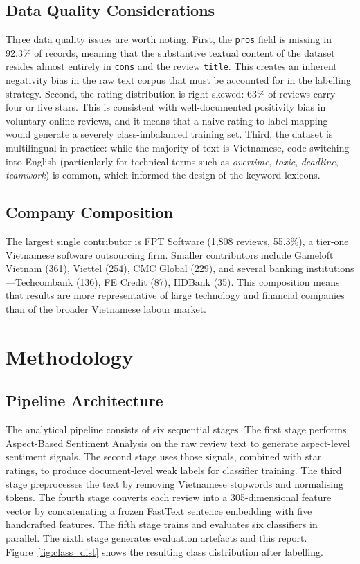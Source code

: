 \documentclass[12pt, a4paper]{article}
\begin{document}
\subsection{Data Quality Considerations}

Three data quality issues are worth noting. First, the \texttt{pros} field is missing in 92.3\% of records, meaning that the substantive textual content of the dataset resides almost entirely in \texttt{cons} and the review \texttt{title}. This creates an inherent negativity bias in the raw text corpus that must be accounted for in the labelling strategy. Second, the rating distribution is right-skewed: 63\% of reviews carry four or five stars. This is consistent with well-documented positivity bias in voluntary online reviews, and it means that a naive rating-to-label mapping would generate a severely class-imbalanced training set. Third, the dataset is multilingual in practice: while the majority of text is Vietnamese, code-switching into English (particularly for technical terms such as \textit{overtime}, \textit{toxic}, \textit{deadline}, \textit{teamwork}) is common, which informed the design of the keyword lexicons.

\subsection{Company Composition}

The largest single contributor is FPT Software (1,808 reviews, 55.3\%), a tier-one Vietnamese software outsourcing firm. Smaller contributors include Gameloft Vietnam (361), Viettel (254), CMC Global (229), and several banking institutions---Techcombank (136), FE Credit (87), HDBank (35). This composition means that results are more representative of large technology and financial companies than of the broader Vietnamese labour market.

\section{Methodology}

\subsection{Pipeline Architecture}

The analytical pipeline consists of six sequential stages. The first stage performs Aspect-Based Sentiment Analysis on the raw review text to generate aspect-level sentiment signals. The second stage uses those signals, combined with star ratings, to produce document-level weak labels for classifier training. The third stage preprocesses the text by removing Vietnamese stopwords and normalising tokens. The fourth stage converts each review into a 305-dimensional feature vector by concatenating a frozen FastText sentence embedding with five handcrafted features. The fifth stage trains and evaluates six classifiers in parallel. The sixth stage generates evaluation artefacts and this report. Figure~\ref{fig:class_dist} shows the resulting class distribution after labelling.
\end{document}
